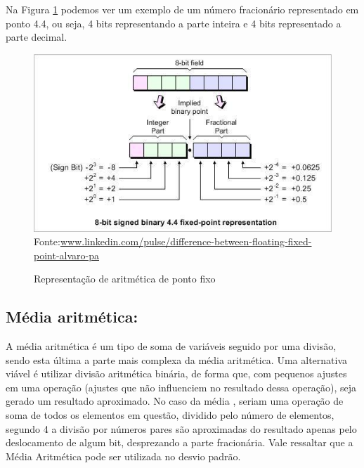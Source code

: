 Na Figura \ref{fp} podemos ver um exemplo de um número fracionário representado em ponto 4.4, ou seja, 4 bits representando a parte inteira e 4 bits representado a parte decimal. 

\begin{figure}[H]
	\centering
	\caption{Representação de aritmética de ponto fixo}
	\includegraphics[width=12cm]{figures/fp.jpg}
	{Fonte:\url{www.linkedin.com/pulse/difference-between-floating-fixed-point-alvaro-pa}}
	
	\label{fp}
\end{figure}




\subsection{Média aritmética:}  A média aritmética é um tipo de soma de variáveis seguido por uma divisão, sendo esta  última a parte mais complexa da média aritmética. Uma alternativa viável é utilizar divisão aritmética binária, de forma que, com pequenos ajustes em uma operação (ajustes que não influenciem no resultado dessa operação), seja gerado um resultado aproximado. No caso da média , seriam uma operação de soma de todos os elementos em questão, dividido pelo número de elementos, segundo {4} a divisão por números pares são aproximadas do resultado apenas pelo deslocamento de algum bit, desprezando a parte fracionária. Vale ressaltar que a Média Aritmética pode ser utilizada no desvio padrão.

